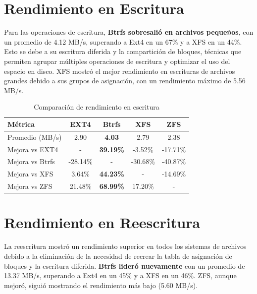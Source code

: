 \section{Rendimiento en Escritura}

Para las operaciones de escritura, \textbf{Btrfs sobresalió en archivos pequeños}, con un promedio de 4.12 MB/s, superando a Ext4 en un 67\% y a XFS en un 44\%. Esto se debe a su escritura diferida y la compartición de bloques, técnicas que permiten agrupar múltiples operaciones de escritura y optimizar el uso del espacio en disco. XFS mostró el mejor rendimiento en escrituras de archivos grandes debido a sus grupos de asignación, con un rendimiento máximo de 5.56 MB/s.

\begin{table}[h!]
\centering
\caption{Comparación de rendimiento en escritura}
\begin{tabular}{|l|c|c|c|c|}
\hline
\textbf{Métrica} & \textbf{EXT4} & \textbf{Btrfs} & \textbf{XFS} & \textbf{ZFS} \\ \hline
Promedio (MB/s)   & 2.90         & \textbf{4.03}  & 2.79         & 2.38         \\ \hline
Mejora vs EXT4    & -            & \textbf{39.19\%} & -3.52\%    & -17.71\%     \\ \hline
Mejora vs Btrfs   & -28.14\%     & -               & -30.68\%    & -40.87\%     \\ \hline
Mejora vs XFS     & 3.64\%       & \textbf{44.23\%} & -          & -14.69\%     \\ \hline
Mejora vs ZFS     & 21.48\%      & \textbf{68.99\%} & 17.20\%    & -            \\ \hline
\end{tabular}
\end{table}

\section{Rendimiento en Reescritura}

La reescritura mostró un rendimiento superior en todos los sistemas de archivos debido a la eliminación de la necesidad de recrear la tabla de asignación de bloques y la escritura diferida. \textbf{Btrfs lideró nuevamente} con un promedio de 13.37 MB/s, superando a Ext4 en un 45\% y a XFS en un 46\%. ZFS, aunque mejoró, siguió mostrando el rendimiento más bajo (5.60 MB/s).

